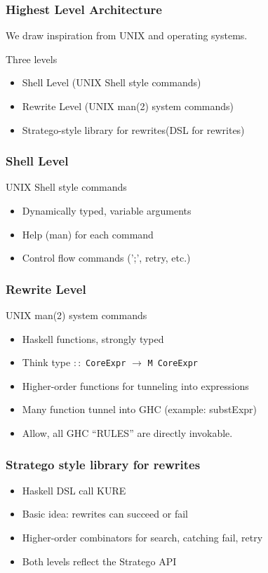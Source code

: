 \begin{frame}

\frametitle{Highest Level Architecture}

We draw inspiration from UNIX and operating systems.

\frameskip{}

{\LARGE Three levels}

\frameskip{}

\begin{itemize}
\item Shell Level \dotfill{} (UNIX Shell style commands)

\item Rewrite Level \dotfill{} (UNIX man(2) system commands)

\item Stratego-style library for rewrites\dotfill(DSL for rewrites)

\end{itemize}

\end{frame}

\begin{frame}

\frametitle{Shell Level}


UNIX Shell style commands
\frameskip{}
\begin{itemize}
\item Dynamically typed, variable arguments
\item Help (man) for each command
\item Control flow commands (';', retry, etc.)
\end{itemize}

\end{frame}

\begin{frame}

\frametitle{Rewrite Level}

UNIX man(2) system commands
\frameskip{}
\begin{itemize}
\item Haskell functions, strongly typed
\item Think type $::$ {\tt CoreExpr} $\rightarrow$ {\tt M CoreExpr}
\item Higher-order functions for tunneling into expressions
\item Many function tunnel into GHC (example: substExpr)
\item Allow, all GHC ``RULES'' are directly invokable.
\end{itemize}

\end{frame}

\begin{frame}

\frametitle{Stratego style library for rewrites}

\begin{itemize}
\item Haskell DSL call KURE
\item Basic idea: rewrites can succeed or fail
\item Higher-order combinators for search, catching fail, retry
\item Both levels reflect the Stratego API
\end{itemize}

\end{frame}

